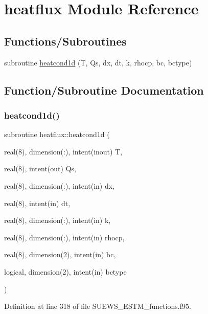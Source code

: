 \hypertarget{namespaceheatflux}{}\section{heatflux Module Reference}
\label{namespaceheatflux}
\subsection*{Functions/\+Subroutines}
\begin{DoxyCompactItemize}
\item 
subroutine \hyperlink{namespaceheatflux_a44a99e2a4ba173804ec1adf16608a8b2}{heatcond1d} (T, Qs, dx, dt, k, rhocp, bc, bctype)
\end{DoxyCompactItemize}


\subsection{Function/\+Subroutine Documentation}
\mbox{\label{namespaceheatflux_a44a99e2a4ba173804ec1adf16608a8b2}} 
\subsubsection{\texorpdfstring{heatcond1d()}{heatcond1d()}}
{\footnotesize\ttfamily subroutine heatflux\+::heatcond1d (\begin{DoxyParamCaption}\item[{real(8), dimension(\+:), intent(inout)}]{T,  }\item[{real(8), intent(out)}]{Qs,  }\item[{real(8), dimension(\+:), intent(in)}]{dx,  }\item[{real(8), intent(in)}]{dt,  }\item[{real(8), dimension(\+:), intent(in)}]{k,  }\item[{real(8), dimension(\+:), intent(in)}]{rhocp,  }\item[{real(8), dimension(2), intent(in)}]{bc,  }\item[{logical, dimension(2), intent(in)}]{bctype }\end{DoxyParamCaption})}



Definition at line 318 of file S\+U\+E\+W\+S\+\_\+\+E\+S\+T\+M\+\_\+functions.\+f95.

